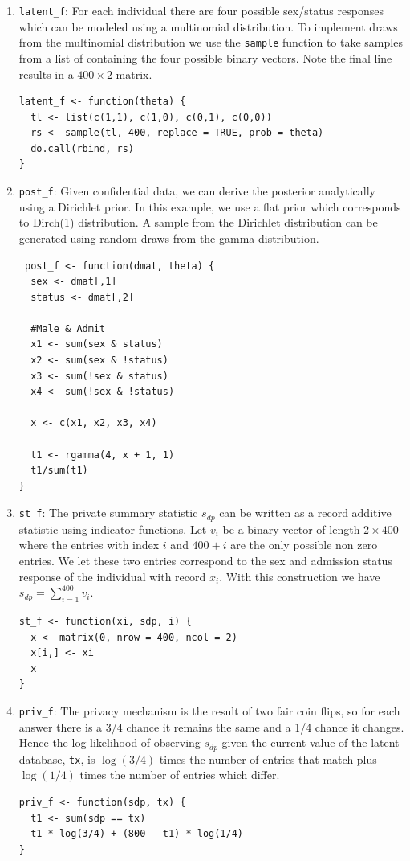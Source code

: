 \begin{enumerate}
\def\labelenumi{\arabic{enumi}.}
\item
  \texttt{latent\_f}: For each individual there are four possible
  sex/status responses which can be modeled using a multinomial distribution.
  To implement draws from the multinomial distribution we use the \texttt{sample} function
  to take samples from a list of containing the four possible binary vectors. Note
  the final line results in a \(400 \times 2\) matrix.

\begin{verbatim}
latent_f <- function(theta) {
  tl <- list(c(1,1), c(1,0), c(0,1), c(0,0))
  rs <- sample(tl, 400, replace = TRUE, prob = theta)
  do.call(rbind, rs)
}
\end{verbatim}
\item
  \texttt{post\_f}: Given confidential data, we can derive the posterior analytically
  using a Dirichlet prior. In this example, we use a flat prior which
  corresponds to Dirch(1) distribution. A sample from the Dirichlet distribution
  can be generated using random draws from the gamma distribution.

\begin{verbatim}
 post_f <- function(dmat, theta) {
  sex <- dmat[,1]
  status <- dmat[,2]

  #Male & Admit
  x1 <- sum(sex & status)
  x2 <- sum(sex & !status)
  x3 <- sum(!sex & status)
  x4 <- sum(!sex & !status)

  x <- c(x1, x2, x3, x4)

  t1 <- rgamma(4, x + 1, 1)
  t1/sum(t1)
}
\end{verbatim}
\item
  \texttt{st\_f}: The private summary statistic \(s_{dp}\) can be written as a record additive
  statistic using indicator functions. Let \(v_i\) be a binary vector of length \(2 \times 400\)
  where the entries with index \(i\) and \(400 + i\) are the only possible non zero entries.
  We let these two entries correspond to the sex and admission status response of
  the individual with record \(x_i\). With this construction we have \(s_{dp} = \sum_{i=1}^{400} v_i\).

\begin{verbatim}
st_f <- function(xi, sdp, i) {
  x <- matrix(0, nrow = 400, ncol = 2)
  x[i,] <- xi
  x
}
\end{verbatim}
\item
  \texttt{priv\_f}: The privacy mechanism is the result of two fair coin flips, so for
  each answer there is a 3/4 chance it remains the same and a 1/4 chance it changes.
  Hence the log likelihood of observing \(s_{dp}\) given the current value of the latent
  database, \texttt{tx}, is \(\log(3/4)\) times the number of entries that match plus \(\log(1/4)\) times
  the number of entries which differ.

\begin{verbatim}
priv_f <- function(sdp, tx) {
  t1 <- sum(sdp == tx)
  t1 * log(3/4) + (800 - t1) * log(1/4)
}
\end{verbatim}
\end{enumerate}

